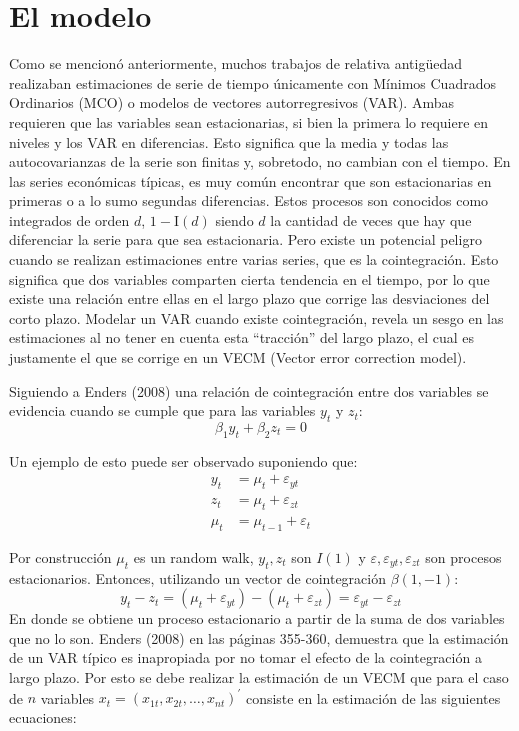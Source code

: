 \documentclass[11pt,a4paper]{article}
\begin{document}
\section{El modelo}

Como se mencionó anteriormente, muchos trabajos de relativa antigüedad realizaban estimaciones de serie de tiempo únicamente con Mínimos Cuadrados Ordinarios (MCO) o modelos de vectores autorregresivos (VAR). Ambas requieren que las variables sean estacionarias, si bien la primera lo requiere en niveles y los VAR en diferencias. Esto significa que la media y todas las autocovarianzas de la serie son finitas y, sobretodo, no cambian con el tiempo.
En las series económicas típicas, es muy común encontrar que son estacionarias en primeras o a lo sumo segundas diferencias. Estos procesos son conocidos como integrados de orden $d$, $1-\mathrm{I}(d)$ siendo $d$ la cantidad de veces que hay que diferenciar la serie para que sea estacionaria. Pero existe un potencial peligro cuando se realizan estimaciones entre varias series, que es la cointegración. Esto significa que dos variables comparten cierta tendencia en el tiempo, por lo que existe una relación entre ellas en el largo plazo que corrige las desviaciones del corto plazo. Modelar un VAR cuando existe cointegración, revela un sesgo en las estimaciones al no tener en cuenta esta ``tracción'' del largo plazo, el cual es justamente el que se corrige en un VECM (Vector error correction model).

Siguiendo a Enders (2008) una relación de cointegración entre dos variables se evidencia cuando se cumple que para las variables $y_t$ y $z_t$:
$$
\beta_1 y_t + \beta_2 z_t = 0
$$

Un ejemplo de esto puede ser observado suponiendo que:
$$
\begin{aligned}
y_{t} &=\mu_{t}+\varepsilon_{y t} \\
z_{t} &=\mu_{t}+\varepsilon_{z t} \\
\mu_{t} &=\mu_{t-1}+\varepsilon_{t}
\end{aligned}
$$

Por construcción $\mu_t $ es un random walk, $y_{t} , z_{t}$ son $I(1)$ y  $\varepsilon , \varepsilon_{y t}, \varepsilon_{z t} $ son procesos estacionarios. Entonces, utilizando un vector de cointegración $\beta(1,-1) $:
$$
y_{t}-z_{t}=\left(\mu_{t}+\varepsilon_{y t}\right)-\left(\mu_{t}+\varepsilon_{z t}\right)=\varepsilon_{y t}-\varepsilon_{z t}
$$
En donde se obtiene un proceso estacionario a partir de la suma de dos variables que no lo son. Enders (2008) en las páginas 355-360, demuestra que la estimación de un VAR típico es inapropiada por no tomar el efecto de la cointegración a largo plazo. Por esto se debe realizar la estimación de un VECM que para el caso de $n $ variables $x_{t}=\left(x_{1 t}, x_{2 t}, \ldots, x_{n t}\right)^{\prime}$ consiste en la estimación de las siguientes ecuaciones:
\end{document}
